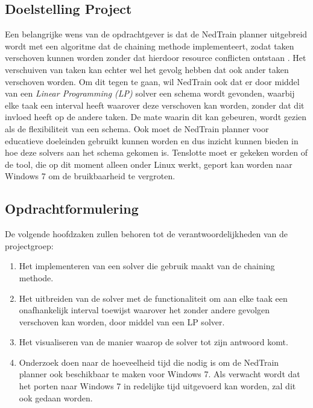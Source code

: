 \subsection{Doelstelling Project}
Een belangrijke wens van de opdrachtgever is dat de NedTrain planner uitgebreid wordt met een algoritme dat de chaining methode implementeert, zodat taken verschoven kunnen worden zonder dat hierdoor resource conflicten ontstaan \cite{seminarium2014}. Het verschuiven van taken kan echter wel het gevolg hebben dat ook ander taken verschoven worden. Om dit tegen te gaan, wil NedTrain ook dat er door middel van een \emph{Linear Programming (LP)} solver een schema wordt gevonden, waarbij elke taak een interval heeft waarover deze verschoven kan worden, zonder dat dit invloed heeft op de andere taken. De mate waarin dit kan gebeuren, wordt gezien als de flexibiliteit van een schema. Ook moet de NedTrain planner voor educatieve doeleinden gebruikt kunnen worden en dus inzicht kunnen bieden in hoe deze solvers aan het schema gekomen is. Tenslotte moet er gekeken worden of de tool, die op dit moment alleen onder Linux werkt, geport kan worden naar Windows 7 om de bruikbaarheid te vergroten.

\newpage

\subsection{Opdrachtformulering}
\label{subsec:opdrachtformulering}
De volgende hoofdzaken zullen behoren tot de verantwoordelijkheden van de projectgroep:
\begin{enumerate}
	\item \label{enum:chaining} Het implementeren van een solver die gebruik maakt van de chaining methode.
	\item \label{enum:LP} Het uitbreiden van de solver met de functionaliteit om aan elke taak een onafhankelijk interval toewijst waarover het zonder andere gevolgen verschoven kan worden, door middel van een LP solver.
	\item \label{enum:visueel} Het visualiseren van de manier waarop de solver tot zijn antwoord komt.
	\item \label{enum:windows} Onderzoek doen naar de hoeveelheid tijd die nodig is om de NedTrain planner ook beschikbaar te maken voor Windows 7. Als verwacht wordt dat het porten naar Windows 7 in redelijke tijd uitgevoerd kan worden, zal dit ook gedaan worden. 
\end{enumerate}

